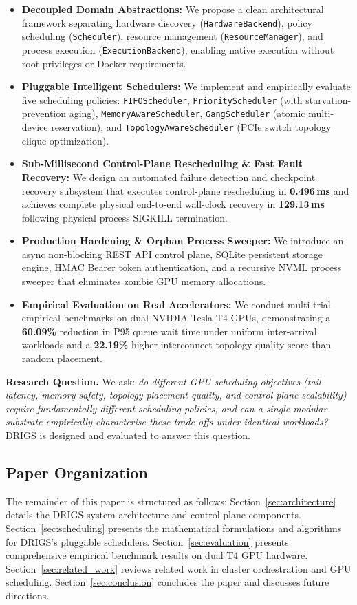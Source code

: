 \begin{itemize}
    \item \textbf{Decoupled Domain Abstractions:} We propose a clean architectural framework separating hardware discovery (\texttt{HardwareBackend}), policy scheduling (\texttt{Scheduler}), resource management (\texttt{ResourceManager}), and process execution (\texttt{ExecutionBackend}), enabling native execution without root privileges or Docker requirements.
    \item \textbf{Pluggable Intelligent Schedulers:} We implement and empirically evaluate five scheduling policies: \texttt{FIFOScheduler}, \texttt{PriorityScheduler} (with starvation-prevention aging), \texttt{MemoryAwareScheduler}, \texttt{GangScheduler} (atomic multi-device reservation), and \texttt{TopologyAwareScheduler} (PCIe switch topology clique optimization).
    \item \textbf{Sub-Millisecond Control-Plane Rescheduling \& Fast Fault Recovery:} We design an automated failure detection and checkpoint recovery subsystem that executes control-plane rescheduling in \textbf{0.496\,ms} and achieves complete physical end-to-end wall-clock recovery in \textbf{129.13\,ms} following physical process SIGKILL termination.
    \item \textbf{Production Hardening \& Orphan Process Sweeper:} We introduce an async non-blocking REST API control plane, SQLite persistent storage engine, HMAC Bearer token authentication, and a recursive NVML process sweeper that eliminates zombie GPU memory allocations.
    \item \textbf{Empirical Evaluation on Real Accelerators:} We conduct multi-trial empirical benchmarks on dual NVIDIA Tesla T4 GPUs, demonstrating a \textbf{60.09\%} reduction in P95 queue wait time under uniform inter-arrival workloads and a \textbf{22.19\%} higher interconnect topology-quality score than random placement.
\end{itemize}

\noindent\textbf{Research Question.} We ask: \emph{do different GPU scheduling objectives (tail latency, memory safety, topology placement quality, and control-plane scalability) require fundamentally different scheduling policies, and can a single modular substrate empirically characterise these trade-offs under identical workloads?} DRIGS is designed and evaluated to answer this question.

\subsection{Paper Organization}
The remainder of this paper is structured as follows: Section~\ref{sec:architecture} details the DRIGS system architecture and control plane components. Section~\ref{sec:scheduling} presents the mathematical formulations and algorithms for DRIGS's pluggable schedulers. Section~\ref{sec:evaluation} presents comprehensive empirical benchmark results on dual T4 GPU hardware. Section~\ref{sec:related_work} reviews related work in cluster orchestration and GPU scheduling. Section~\ref{sec:conclusion} concludes the paper and discusses future directions.
